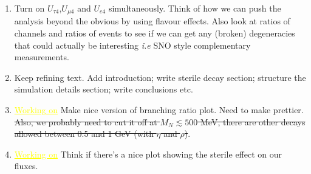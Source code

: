 \documentclass[11pt, a4paper]{article}
\def\muboone{MicroBooNE}
\newcommand{\newtext}[2]{\textcolor{#1}{\ul{#2}}}
\begin{document}
\begin{enumerate}
\item Turn on $U_{\tau 4}$,$U_{\mu 4}$ and $U_{e4}$ simultaneously. Think of
how we can push the analysis beyond the obvious by using flavour effects. Also
look at ratios of channels and ratios of events to see if we can get any
(broken) degeneracies that could actually be interesting \emph{i.e} SNO style
complementary measurements.

\item Keep refining text. Add introduction; write sterile decay section; structure 
the simulation details section; write conclusions etc.

\item \newtext{MARK}{Working on} Make nice version of branching ratio plot. Need to make prettier. \sout{Also, we probably need to cut it off at 
	$M_N\lesssim 500$ MeV, there are other decays allowed between 0.5 and 1 GeV (with $\eta$ and $\rho$)}.

\item \newtext{MARK}{Working on} Think if there's a nice plot showing the sterile effect on our fluxes.

%


	\end{enumerate}



	




{}
\end{document}
